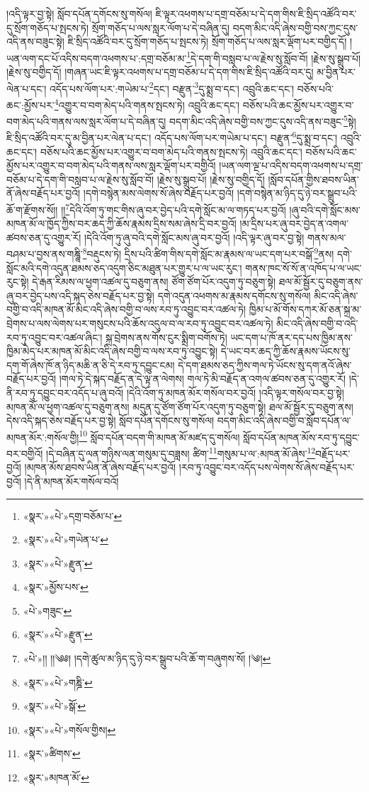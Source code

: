 །འདི་ལྟར་བྱ་སྟེ། སློབ་དཔོན་དགོངས་སུ་གསོལ། ཇི་ལྟར་འཕགས་པ་དགྲ་བཅོམ་པ་དེ་དག་གིས་ཇི་སྲིད་འཚོའི་བར་དུ་སྲོག་གཅོད་པ་སྤངས་ཏེ། སྲོག་གཅོད་པ་ལས་སླར་ལོག་པ་དེ་བཞིན་དུ། བདག་མིང་འདི་ཞེས་བགྱི་བས་ཀྱང་དུས་འདི་ནས་བཟུང་སྟེ། ཇི་སྲིད་འཚོའི་བར་དུ་སྲོག་གཅོད་པ་སྤངས་ཏེ། སྲོག་གཅོད་པ་ལས་སླར་ལྡོག་པར་བགྱིད་དོ། །ཡན་ལག་དང་པོ་འདིས་བདག་འཕགས་པ་:དགྲ་བཅོམ་མ་\footnote{«སྣར་»«པེ་»དགྲ་བཅོམ་པ་}དེ་དག་གི་བསླབ་པ་ལ་རྗེས་སུ་སློབ་བོ། །རྗེས་སུ་སྒྲུབ་པོ། །རྗེས་སུ་བགྱིད་དོ། །གཞན་ཡང་ཇི་ལྟར་འཕགས་པ་དགྲ་བཅོམ་པ་དེ་དག་གིས་ཇི་སྲིད་འཚོའི་བར་དུ། མ་བྱིན་པར་ལེན་པ་དང་། འདོད་པས་ལོག་པར་:གཡེམ་པ་\footnote{«སྣར་»«པེ་»གཡེན་པ་}དང་། བརྫུན་\footnote{«སྣར་»«པེ་»རྫུན་}དུ་སྨྲ་བ་དང་། འབྲུའི་ཆང་དང་། བཅོས་པའི་ཆང་:མྱོས་པར་\footnote{«སྣར་»མྱོས་པས་}འགྱུར་བ་བག་མེད་པའི་གནས་སྤངས་ཏེ། འབྲུའི་ཆང་དང་། བཅོས་པའི་ཆང་མྱོས་པར་འགྱུར་བ་བག་མེད་པའི་གནས་ལས་སླར་ལོག་པ་དེ་བཞིན་དུ། བདག་མིང་འདི་ཞེས་བགྱི་བས་ཀྱང་དུས་འདི་ནས་བཟུང་\footnote{«པེ་»གཟུང་}སྟེ། ཇི་སྲིད་འཚོའི་བར་དུ་མ་བྱིན་པར་ལེན་པ་དང་། འདོད་པས་ལོག་པར་གཡེམ་པ་དང་། བརྫུན་\footnote{«སྣར་»«པེ་»རྫུན་}དུ་སྨྲ་བ་དང་། འབྲུའི་ཆང་དང་། བཅོས་པའི་ཆང་མྱོས་པར་འགྱུར་བ་བག་མེད་པའི་གནས་སྤངས་ཏེ། འབྲུའི་ཆང་དང་། བཅོས་པའི་ཆང་མྱོས་པར་འགྱུར་བ་བག་མེད་པའི་གནས་ལས་སླར་ལྡོག་པར་བགྱིའོ། །ཡན་ལག་ལྔ་པ་འདིས་བདག་འཕགས་པ་དགྲ་བཅོམ་པ་དེ་དག་གི་བསླབ་པ་ལ་རྗེས་སུ་སློབ་བོ། །རྗེས་སུ་སྒྲུབ་པོ། །རྗེས་སུ་བགྱིད་དོ། །སློབ་དཔོན་གྱིས་ཐབས་ཡིན་ནོ་ཞེས་བརྗོད་པར་བྱའོ། །དགེ་བསྙེན་མས་ལེགས་སོ་ཞེས་བརྗོད་པར་བྱའོ། །དགེ་བསྙེན་མ་ཉིད་དུ་ཉེ་བར་སྒྲུབ་པའི་ཆོ་ག་རྫོགས་སོ།། །།\footnote{«པེ་»།། །།༄༅། །དགེ་ཚུལ་མ་ཉིད་དུ་ཉེ་བར་སྒྲུབ་པའི་ཆོ་ག་བཞུགས་སོ། །༄། }དེའི་འོག་ཏུ་གང་གིས་ཞུ་བར་བྱེད་པའི་དགེ་སློང་མ་ལ་གཏད་པར་བྱའོ། །ཞུ་བའི་དགེ་སློང་མས་མཁན་མོ་ལ་ཁྱོད་ཀྱིས་བར་ཆད་ཀྱི་ཆོས་རྣམས་དྲིས་སམ་ཞེས་དྲི་བར་བྱའོ། །མ་དྲིས་པར་ཞུ་བར་བྱེད་ན་འགལ་ཚབས་ཅན་དུ་འགྱུར་རོ། །དེའི་འོག་ཏུ་ཞུ་བའི་དགེ་སློང་མས་ཞུ་བར་བྱའོ། །འདི་ལྟར་ཞུ་བར་བྱ་སྟེ། གནས་མལ་བཤམ་པ་བྱས་ནས་གཎྜཱི་\footnote{«སྣར་»«པེ་»གཎྜི་}བརྡུངས་ཏེ། དྲིས་པའི་ཚིག་གིས་དགེ་སློང་མ་རྣམས་ལ་ཡང་དག་པར་བསྒོ་\footnote{«སྣར་»«པེ་»སྒོ་}ནས། དགེ་སློང་མའི་དགེ་འདུན་ཐམས་ཅད་འདུག་ཅིང་མཐུན་པར་གྱུར་པ་ལ་ཡང་རུང་། གནས་ཁང་སོ་སོ་ན་འཁོད་པ་ལ་ཡང་རུང་སྟེ། དེ་རྒན་རིམས་ལ་ཕྱག་འཚལ་དུ་བཅུག་ནས། ཙོག་ཙོག་པོར་འདུག་ཏུ་བཅུག་སྟེ། ཐལ་མོ་སྦྱོར་དུ་བཅུག་ནས་ཞུ་བར་བྱེད་པས་འདི་སྐད་ཅེས་བརྗོད་པར་བྱ་སྟེ། དགེ་འདུན་འཕགས་མ་རྣམས་དགོངས་སུ་གསོལ། མིང་འདི་ཞེས་བགྱི་བ་འདི་མཁན་མོ་མིང་འདི་ཞེས་བགྱི་བ་ལས་རབ་ཏུ་འབྱུང་བར་འཚལ་ཏེ། ཁྱིམ་པ་མོ་གོས་དཀར་མོ་ཅན་སྐྲ་མ་བྲེགས་པ་ལས་ལེགས་པར་གསུངས་པའི་ཆོས་འདུལ་བ་ལ་རབ་ཏུ་འབྱུང་བར་འཚལ་ཏེ། མིང་འདི་ཞེས་བགྱི་བ་འདི་རབ་ཏུ་འབྱུང་བར་འཚལ་ཞིང་། སྐྲ་བྲེགས་ནས་གོས་ངུར་སྨྲིག་བགོས་ཏེ། ཡང་དག་པ་ཁོ་ནར་དད་པས་ཁྱིམ་ནས་ཁྱིམ་མེད་པར་མཁན་མོ་མིང་འདི་ཞེས་བགྱི་བ་ལས་རབ་ཏུ་འབྱུང་སྟེ། དེ་ཡང་བར་ཆད་ཀྱི་ཆོས་རྣམས་ཡོངས་སུ་དག་གོ་ཞེས་ཁོ་ན་ཉིད་མཆི་ན་ཅི་དེ་རབ་ཏུ་དབྱུང་ངམ། དེ་དག་ཐམས་ཅད་ཀྱིས་གལ་ཏེ་ཡོངས་སུ་དག་ནའོ་ཞེས་བརྗོད་པར་བྱའོ། །གལ་ཏེ་དེ་སྐད་བརྗོད་ན་དེ་ལྟ་ན་ལེགས། གལ་ཏེ་མི་བརྗོད་ན་འགལ་ཚབས་ཅན་དུ་འགྱུར་རོ། །དེ་ནི་རབ་ཏུ་དབྱུང་བར་འདོད་པ་ཞུ་བའོ། །དེའི་འོག་ཏུ་མཁན་མོར་གསོལ་བར་བྱའོ། །འདི་ལྟར་གསོལ་བར་བྱ་སྟེ། མཁན་མོ་ལ་ཕྱག་འཚལ་དུ་བཅུག་ནས། མདུན་དུ་ཙོག་ཙོག་པོར་འདུག་ཏུ་བཅུག་སྟེ། ཐལ་མོ་སྦྱོར་དུ་བཅུག་ནས། དེས་འདི་སྐད་ཅེས་བརྗོད་པར་བྱ་སྟེ། སློབ་དཔོན་དགོངས་སུ་གསོལ། བདག་མིང་འདི་ཞེས་བགྱི་བ་སློབ་དཔོན་ལ་མཁན་མོར་:གསོལ་གྱི།\footnote{«སྣར་»«པེ་»གསོལ་གྱིས།} སློབ་དཔོན་བདག་གི་མཁན་མོ་མཛད་དུ་གསོལ། སློབ་དཔོན་མཁན་མོས་རབ་ཏུ་དབྱུང་བར་བགྱིའོ། །དེ་བཞིན་དུ་ལན་གཉིས་ལན་གསུམ་དུ་བཟླས། ཚིག་\footnote{«སྣར་»ཚིགས་}གསུམ་པ་ལ་:མཁན་མོ་ཞེས་\footnote{«སྣར་»མཁན་མོ་}བརྗོད་པར་བྱའོ། །མཁན་མོས་ཐབས་ཡིན་ནོ་ཞེས་བརྗོད་པར་བྱའོ། །རབ་ཏུ་འབྱུང་བར་འདོད་པས་ལེགས་སོ་ཞེས་བརྗོད་པར་བྱའོ། །དེ་ནི་མཁན་མོར་གསོལ་བའོ། 